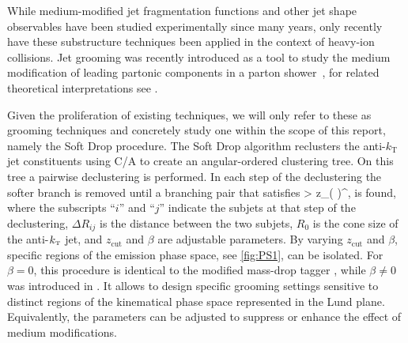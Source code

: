 While medium-modified jet fragmentation functions and other jet shape observables have been studied experimentally since many years, only recently have these substructure techniques been applied in the context of heavy-ion collisions.
Jet grooming was recently introduced as a tool to study the medium modification of leading partonic components in a parton shower~\cite{Sirunyan:2017bsd}, for related theoretical interpretations see \cite{Chien:2016led,Mehtar-Tani:2016aco,Milhano:2017nzm,Chang:2017gkt}. 

Given the proliferation of existing techniques, we will only refer to these as grooming techniques and concretely study one within the scope of this report, namely the Soft Drop procedure.
The Soft Drop algorithm reclusters the anti-$k_{\mathrm{T}}$ jet constituents using C/A to create an angular-ordered clustering tree. On this tree a pairwise declustering is performed. In each step of the declustering the softer branch is removed until a branching pair that satisfies
\beq
\label{eq:groompar}
 > z_{}\left(  \right)^{\beta},
\eeq
is found, where the subscripts ``$i$'' and ``$j$'' indicate the subjets at that step of the declustering, $\Delta R_{ij}$ is the distance between the two subjets, $R_{0}$ is the cone size of the anti-$k_{\text{\tiny T}}$ jet, and $z_{\text{cut}}$ and $\beta$ are adjustable parameters. By varying $z_{\text{cut}}$ and $\beta$, specific regions of the emission phase space, see \autoref{fig:PS1}, can be isolated. For $\beta = 0$, this procedure is identical to the modified mass-drop tagger \cite{Dasgupta:2013ihk}, while $\beta \neq 0$ was introduced in \cite{Larkoski:2014wba}. It allows to design specific grooming settings sensitive to distinct regions of the kinematical phase space represented in the Lund plane. Equivalently, the parameters can be adjusted to suppress or enhance the effect of medium modifications.


